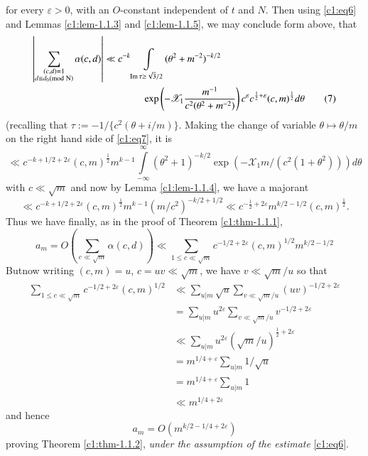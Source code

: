 for every $\varepsilon > 0$, with an $O$-constant independent of $t$ and
$N$. Then using \eqref{c1:eq6} and Lemmas \ref{c1:lem-1.1.3}
 and \ref{c1:lem-1.1.5}, we may conclude form above, that
\begin{align*}
\left|\sum_{\substack{(c,d)=1\\ d\equiv d_{0}(\rm{mod} \; N)}}
\alpha(c,d)\right|&\ll
c^{-k}\int\limits_{\operatorname{Im} \tau\geq
  \sqrt{3}/2} (\theta^{2}+m^{-2})^{-k/2}\\ 
&\hspace{1.4cm}\exp\left(-\mathscr{X}_{1}
\frac{m^{-1}}{c^{2} (\theta^{2}+m^{-2})}\right) c^{\varepsilon}
c^{\frac{1}{2}+\varepsilon}(c,m)^{\frac{1}{2}}d\theta\tag{7}\label{c1:eq7}   
\end{align*}
(recalling that $\tau:=-1/\{c^{2}(\theta+i/m)\}$. Making the change of
variable $\theta\mapsto \theta/m$ on the right hand side of \eqref{c1:eq7},
it is
$$
\ll
c^{-k+1/2+2\varepsilon} (c,m)^{\frac{1}{2}}m^{k-1}
\int\limits^{\infty}_{-\infty} (\theta^{2}+1)^{-k/2}
\exp(-\mathscr{X}_{1}m/(c^{2}(1+\theta^{2})))d\theta  
$$
with $c\ll \sqrt{m}$ and now by Lemma \ref{c1:lem-1.1.4}, we have a
majorant
$$
\ll
c^{-k+1/2+2\varepsilon}(c,m)^{\frac{1}{2}}m^{k-1}(m/c^{2})^{-k/2+1/2}\ll
c^{-\frac{1}{2}+2\varepsilon}m^{k/2-1/2}(c,m)^{\frac{1}{2}}.
$$
Thus we have finally, as in the proof of Theorem \ref{c1:thm-1.1.1},
$$
a_{m}=O\left(\sum_{c\ll \sqrt{m}}\alpha(c,d)\right)\ll \sum_{1\leq c\ll
  \sqrt{m}}c^{-1/2+2\varepsilon}(c,m)^{1/2}m^{k/2-1/2}
$$
But\pageoriginale now writing $(c,m)=u$, $c=uv\ll \sqrt{m}$, we have
$v\ll\sqrt{m}/u$ so that
\begin{align*}
\sum_{1\leq c\ll \sqrt{m}}c^{-1/2+2\varepsilon}(c,m)^{1/2} &\ll
\sum_{u|m}\sqrt{u}\sum_{v\ll\sqrt{m}/u}(uv)^{-1/2+2\varepsilon}\\
&= \sum_{u|m}u^{2\varepsilon}\sum_{v\ll \sqrt{m}/u}v^{-1/2+2\varepsilon}\\
&\ll \sum_{u|m}u^{2\varepsilon}(\sqrt{m}/u)^{\frac{1}{2}+2\varepsilon}\\
&= m^{1/4+\varepsilon}\sum_{u|m}1/\sqrt{u}\\
&= m^{1/4+\varepsilon}\sum_{u|m}1\\
&\ll m^{1/4+2\varepsilon}
\end{align*}
and hence
\begin{equation*}
a_{m}=O(m^{k/2-1/4+2\varepsilon})\tag{8}\label{c1:eq8}
\end{equation*}
proving Theorem \ref{c1:thm-1.1.2}, {\em under the assumption of the
  estimate} \eqref{c1:eq6}.

